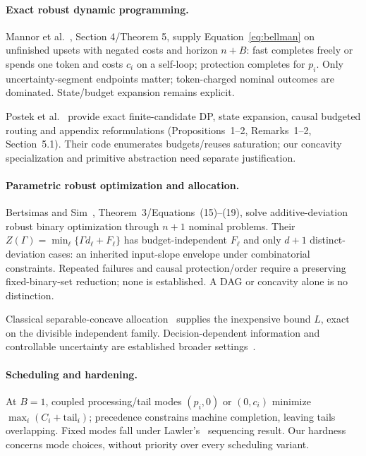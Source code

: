 \documentclass[acmsmall,screen,review,anonymous]{acmart}
\begin{document}
\paragraph{Exact robust dynamic programming.}
Mannor et al.~\cite{mannor}, Section 4/Theorem 5, supply Equation~\eqref{eq:bellman} on unfinished upsets with negated costs and horizon $n+B$: fast completes freely or spends one token and costs $c_i$ on a self-loop; protection completes for $p_i$. Only uncertainty-segment endpoints matter; token-charged nominal outcomes are dominated. State/budget expansion remains explicit.

Postek et al.~\cite{postek} provide exact finite-candidate DP, state expansion, causal budgeted routing and appendix reformulations (Propositions~1--2, Remarks~1--2, Section~5.1). Their code enumerates budgets/reuses saturation; our concavity specialization and primitive abstraction need separate justification.

\paragraph{Parametric robust optimization and allocation.}
Bertsimas and Sim~\cite{bertsimas2003}, Theorem~3/Equations~(15)--(19), solve additive-deviation robust binary optimization through $n+1$ nominal problems. Their $Z(\Gamma)=\min_\ell\{\Gamma d_\ell+F_\ell\}$ has budget-independent $F_\ell$ and only $d+1$ distinct-deviation cases: an inherited input-slope envelope under combinatorial constraints. Repeated failures and causal protection/order require a preserving fixed-binary-set reduction; none is established. A DAG or concavity alone is no distinction.

Classical separable-concave allocation~\cite{federgruen,bertsimas} supplies the inexpensive bound $L$, exact on the divisible independent family. Decision-dependent information and controllable uncertainty are established broader settings~\cite{vayanos,ley}.

\paragraph{Scheduling and hardening.}
At $B=1$, coupled processing/tail modes $(p_i,0)$ or $(0,c_i)$ minimize $\max_i(C_i+\text{tail}_i)$; precedence constrains machine completion, leaving tails overlapping. Fixed modes fall under Lawler's~\cite{lawler} sequencing result. Our hardness concerns mode choices, without priority over every scheduling variant.
\end{document}
